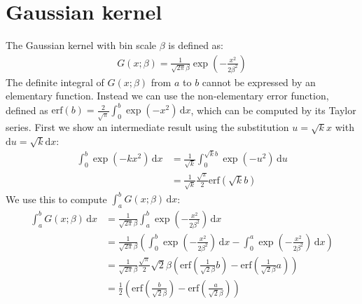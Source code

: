 \documentclass[thesis.tex]{subfiles}
\begin{document}
\section{Gaussian kernel}
\label{apx:gaussianKernel}
%
The Gaussian kernel with bin scale $\beta$ is defined as:
%
\begin{align*}
G(x;\beta) = \frac{1}{\sqrt{2\pi} \beta}
\exp\left( -\frac{x^2}{2 \beta^2} \right)
\end{align*}
%
The definite integral of $G(x;\beta)$ from $a$ to $b$ cannot be expressed by an elementary function. Instead we can use the non-elementary error function, defined as $\mathrm{erf}(b) = \frac{2}{\sqrt{\pi}} \int_0^b \exp(-x^2) \,\mathrm dx$, which can be computed by its Taylor series. First we show an intermediate result using the substitution $u = \sqrt{k} x$ with $\mathrm du = \sqrt{k} \mathrm dx$:
%
\begin{align*}
\int_0^b \exp(-k x^2) \,\mathrm dx
&= \frac{1}{\sqrt{k}} \int_0^{\sqrt{k}b} \exp(-u^2) \,\mathrm du \\
&= \frac{1}{\sqrt{k}} \frac{\sqrt{\pi}}{2} \mathrm{erf} \left( \sqrt{k} b \right)
\end{align*}
%
We use this to compute $\int_a^b G(x;\beta) \,\mathrm dx$:
%
\begin{align*}
\int_a^b G(x;\beta) \,\mathrm dx
&= \frac{1}{\sqrt{2\pi} \beta} \int_a^b \exp\left( -\frac{x^2}{2 \beta^2} \right) \,\mathrm dx \\
&= \frac{1}{\sqrt{2\pi} \beta} \left( \int_0^b \exp\left( -\frac{x^2}{2 \beta^2} \right) \,\mathrm dx - \int_0^a \exp\left( -\frac{x^2}{2 \beta^2} \right) \,\mathrm dx \right) \\
&= \frac{1}{\sqrt{2\pi} \beta} \frac{\sqrt{\pi}}{2} \sqrt{2} \beta \left(
\mathrm{erf} \left( \frac{1}{\sqrt{2} \beta} b \right) -
\mathrm{erf} \left( \frac{1}{\sqrt{2} \beta} a \right) \right) \\
&= \frac{1}{2} \left(
\mathrm{erf} \left( \frac{b}{\sqrt{2} \beta} \right) -
\mathrm{erf} \left( \frac{a}{\sqrt{2} \beta} \right)
\right)
\end{align*}
%
\end{document}
